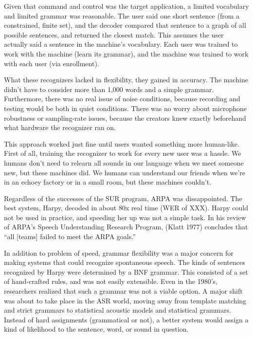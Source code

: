 \documentclass[10pt,a4paper]{article}
\begin{document}
Given that command and control was the target application, a limited vocabulary and limited grammar was reasonable. The user said one short sentence (from a constrained, finite set), and the decoder compared that sentence to a graph of all possible sentences, and returned the closest match. This assumes the user actually said a sentence in the machine's vocabulary. Each user was trained to work with the machine (learn its grammar), and the machine was trained to work with each user (via enrollment). 

What these recognizers lacked in flexibility, they gained in accuracy. The machine didn't have to consider more than 1,000 words and a simple grammar. Furthermore, there was no real issue of noise conditions, because recording and testing would be both in quiet conditions. There was no worry about microphone robustness or sampling-rate issues, because the creators knew exactly beforehand what hardware the recognizer ran on.

This approach worked just fine until users wanted something more human-like. First of all, training the recognizer to work for every new user was a hassle. We humans don't need to relearn all sounds in our language when we meet someone new, but these machines did. We humans can understand our friends when we're in an echoey factory or in a small room, but these machines couldn't.

Regardless of the successes of the SUR program, ARPA was dissappointed. The best system, Harpy, decoded in about 80x real time (WER of XXX). Harpy could not be used in practice, and speeding her up was not a simple task. In his review of ARPA's Speech Understanding Research Program, (Klatt 1977) concludes that ``all [teams] failed to meet the ARPA goals.''


In addition to problem of speed, grammar flexibility was a major concern for making systems that could recognize spontaneous speech. The kinds of sentences recognized by Harpy were determined by a BNF grammar. This consisted of a set of hand-crafted rules, and was not easily extensible. Even in the 1980's, researchers realized that such a grammar was not a viable option. A major shift was about to take place in the ASR world, moving away from template matching and strict grammars to statistical acoustic models and statistical grammars. Instead of hard assignments (grammatical or not), a better system would assign a kind of likelihood to the sentence, word, or sound in question.
\end{document}
